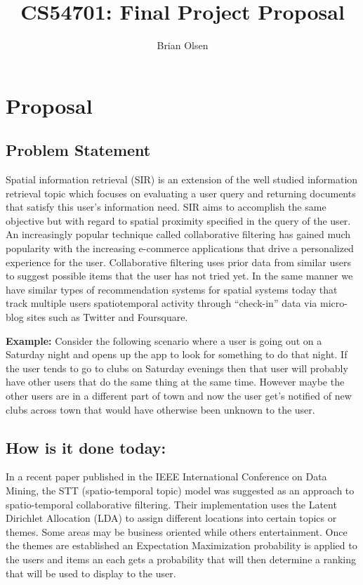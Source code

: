 \documentclass[11pt]{article}
\title{
\vspace{-20.mm}
CS54701: Final Project Proposal}
\author{Brian Olsen}
\date{}                                           %
\begin{document}
\maketitle

\vspace{-10.mm}
\section{Proposal} 
\subsection{Problem Statement}Spatial information retrieval (SIR) is an extension of the well studied information retrieval topic which focuses on evaluating a user query and returning documents that satisfy this user's information need. SIR aims to accomplish the same objective but with regard to spatial proximity specified in the query of the user. An increasingly popular technique called collaborative filtering has gained much popularity with the increasing e-commerce applications that drive a personalized experience for the user. Collaborative filtering uses prior data from similar users to suggest possible items that the user has not tried yet. In the same manner we have similar types of recommendation systems for spatial systems today that track multiple users spatiotemporal activity through ``check-in'' data via micro-blog sites such as Twitter and Foursquare.\newline

\textbf{Example: }Consider the following scenario where a user is going out on a Saturday night and opens up the app to look for something to do that night. If the user tends to go to clubs on Saturday evenings then that user will probably have other users that do the same thing at the same time. However maybe the other users are in a different part of town and now the user get's notified of new clubs across town that would have otherwise been unknown to the user. 

\subsection{How is it done today: }In a recent paper published in the IEEE International Conference on Data Mining, the STT (spatio-temporal topic) model was suggested as an approach to spatio-temporal collaborative filtering. Their implementation uses the Latent Dirichlet Allocation (LDA)  to assign different locations into certain topics or themes. Some areas may be business oriented while others entertainment. Once the themes are established an Expectation Maximization probability is applied to the users and items an each gets a probability that will then determine a ranking that will be used to display to the user. 
\end{document}
